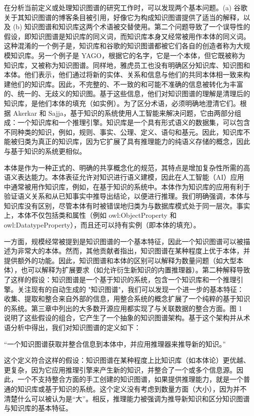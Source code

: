 \documentclass[a4paper,AutoFakeBold,oneside,12pt]{book}
\begin{document}
\begin{nopagenumber}
	在分析当前定义或处理知识图谱的研究工作时，可以发现两个基本问题。(a) 谷歌关于其知识图谱的博客条目被引用，好像它为构成知识图谱提供了适当的解释，以及 (b) 知识图谱和知识库这两个术语被交替使用。第二个问题导致了一个误导性的假设，即知识图谱是知识库的同义词，而知识库本身又经常被用作本体的同义词。这种混淆的一个例子是，知识库和谷歌的知识图谱都被它们各自的创造者称为大规模知识库。另一个例子是 YAGO，根据它的名字，它是一个本体，但它既被称为知识库，又被称为知识图谱。同样地，雅虎员工也没有明确区分知识库、知识图和本体。他们表示，他们通过将新的实体、关系和信息与他们的共同本体相一致来构建他们的知识库。因此，不完整的、不一致的和可能不准确的信息被转化为丰富的、统一的、无歧义的知识图。基于这些信息，他们对知识图谱的理解是清理后的知识库，是他们本体的填充（如实例）。为了区分术语，必须明确地澄清它们。根据 Akerkar 和 Sajja，基于知识的系统使用人工智能来解决问题，它由两部分组成：一个知识库和一个推理引擎。知识库是一个具有形式语义的数据集，可以包含不同种类的知识，例如，规则、事实、公理、定义、语句和基元。因此，知识库不能被归类为真正的知识库，因为它扩展了具有推理能力的纯语义存储的概念，因此与基于知识的系统更相似。

	本体是作为一种正式的、明确的共享概念化的规范，其特点是增加复杂性所需的高语义表达能力。本体表征允许对知识进行语义建模，因此在人工智能（AI）应用中通常被用作知识库，例如，在基于知识的系统中。本体作为知识库的应用有利于验证语义关系和从已知事实中推导出结论，以便进行推理。我们明确强调，本体与知识库没有区别，尽管本体有时被错误地归类为与数据库模式处于同一层次。事实上，本体不仅包括类和属性（例如 owl:ObjectProperty 和 owl:DatatypeProperty），而且还可以持有实例（即本体的填充）。

	一方面，规模经常被提到是知识图谱的一个基本特征，因此一个知识图谱可以被描述为非常大的本体。然而，其他贡献者指出，知识图谱在某种程度上优于本体，并提供额外的功能。因此，知识图谱和本体的区别可以解释为数量问题（如大型本体），也可以解释为扩展要求（如允许衍生新知识的内置推理器）。第二种解释导致了这样的假设：知识图谱是一个基于知识的系统，包含一个知识库和一个推理引擎。关注现有的自动生成的 "知识图谱"，我们可以发现一个进一步的基本特征：收集、提取和整合来自外部的信息，用整合系统的概念扩展了一个纯粹的基于知识的系统。第三章中列出的大多数开源应用都实现了与关联数据的整合方面。图 1 说明了这些假设的组合，它产生了一个抽象的知识图谱架构。基于这个架构并从术语分析中得出，我们对知识图谱的定义如下：

	``一个知识图谱获取并整合信息到本体中，并应用推理器来推导新的知识。''

	这个定义符合这样的假设：知识图谱在某种程度上比知识库（如本体论）更优越、更复杂，因为它应用推理引擎来产生新的知识，并整合了一个或多个信息源。因此，一个不支持整合方面的手工创建的知识图谱，如果提供推理能力，就是一个普通的知识库或基于知识的系统。这个定义没有考虑到数量方面（大小），因为并不清楚什么可以被认为是``大''。相反，推理能力被强调为推导新知识和区分知识图谱与知识库的基本特征。


\end{nopagenumber}
\end{document}
